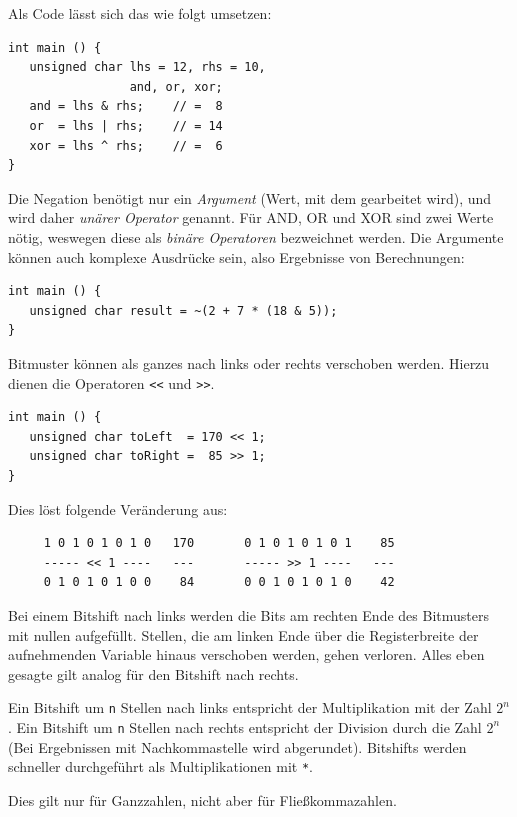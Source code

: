 Als Code lässt sich das wie folgt umsetzen:
\begin{codebox}
\begin{verbatim}
int main () {
   unsigned char lhs = 12, rhs = 10,
                 and, or, xor;
   and = lhs & rhs;    // =  8
   or  = lhs | rhs;    // = 14
   xor = lhs ^ rhs;    // =  6
}
\end{verbatim}
\end{codebox}

Die Negation benötigt nur ein \emph{Argument} (Wert, mit dem gearbeitet wird), und wird daher \emph{unärer Operator} genannt. Für AND, OR und XOR sind zwei Werte nötig, weswegen diese als \emph{binäre Operatoren} bezweichnet werden. Die Argumente können auch komplexe Ausdrücke sein, also Ergebnisse von Berechnungen:
\begin{codebox}
\begin{verbatim}
int main () {
   unsigned char result = ~(2 + 7 * (18 & 5));
}
\end{verbatim}
\end{codebox}

Bitmuster können als ganzes nach links oder rechts verschoben werden. Hierzu dienen die Operatoren \texttt{<{}<} und \texttt{>{}>}.
\begin{codebox}
\begin{verbatim}
int main () {
   unsigned char toLeft  = 170 << 1;
   unsigned char toRight =  85 >> 1;
}
\end{verbatim}
\end{codebox}
Dies löst folgende Veränderung aus:
\begin{codebox}
\begin{verbatim}
     1 0 1 0 1 0 1 0   170       0 1 0 1 0 1 0 1    85
     ----- << 1 ----   ---       ----- >> 1 ----   ---
     0 1 0 1 0 1 0 0    84       0 0 1 0 1 0 1 0    42
\end{verbatim}
\end{codebox}
Bei einem Bitshift nach links werden die Bits am rechten Ende des Bitmusters mit nullen aufgefüllt. Stellen, die am linken Ende über die Registerbreite der aufnehmenden Variable hinaus verschoben werden, gehen verloren. Alles eben gesagte gilt analog für den Bitshift nach rechts.

\begin{hintbox}
Ein Bitshift um \texttt{n} Stellen nach links entspricht der Multiplikation mit der Zahl $2^{n}$.
Ein Bitshift um \texttt{n} Stellen nach rechts entspricht der Division durch die Zahl $2^{n}$ (Bei Ergebnissen mit Nachkommastelle wird abgerundet). Bitshifts werden schneller durchgeführt als Multiplikationen mit \texttt{*}.

Dies gilt nur für Ganzzahlen, nicht aber für Fließkommazahlen.
\end{hintbox}

